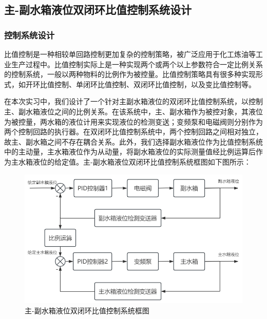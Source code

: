 \documentclass[UTF8]{article}
\begin{document}
\subsection{主-副水箱液位双闭环比值控制系统设计}
\subsubsection{控制系统设计}
比值控制是一种相较单回路控制更加复杂的控制策略，被广泛应用于化工炼油等工业生产过程中。比值控制实际上是一种实现两个或两个以上参数符合一定比例关系的控制系统，一般以两种物料的比例作为被控量。比值控制策略具有很多种实现形式，如开环比值控制、单闭环比值控制、双闭环比值控制，以及变比值控制等。

在本次实习中，我们设计了一个针对主副水箱液位的双闭环比值控制系统，以控制主、副水箱液位之间的比例关系。在该系统中，主、副水箱作为被控对象，其液位为被控量，两水箱的液位计用来实现液位的检测变送；变频泵和电磁阀则分别作为两个控制回路的执行器。在双闭环比值控制系统中，两个控制回路之间相对独立，故主、副水箱之间不存在耦合关系。此外，我们选择副水箱液位作为比值控制系统中的主动量，主水箱液位作为从动量，将副水箱液位的实际测量值经比例运算后作为主水箱液位的给定值。主-副水箱液位双闭环比值控制系统框图如下图所示：
\begin{figure}[H]
    \centering %
    \includegraphics[width=.8\textwidth]{figure/比值控制系统框图.png} 
    \caption{主-副水箱液位双闭环比值控制系统框图} %
\end{figure}

\end{document}
